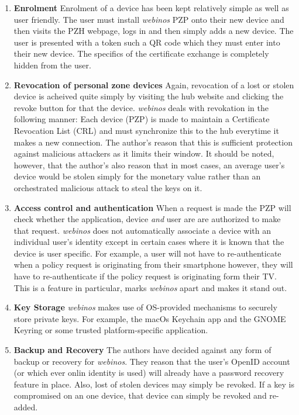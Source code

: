 \begin{enumerate}[label=\arabic*., wide, labelwidth=!, labelindent=0pt]
	\item \textbf{Enrolment} Enrolment of a device has been kept relatively simple as well as user friendly. The user must install \textit{webinos} 		PZP onto their new device and then visits the PZH webpage, logs in and then simply adds a new device. The user is presented with a token such 	a QR code which they must enter into their new device. The specifics of the certificate exchange is completely hidden from the user.
	
	\item \textbf{Revocation of personal zone devices} Again, revocation of a lost or stolen device is acheived quite simply by visiting the hub 				website and clicking the revoke button for that the device. \textit{webinos} deals with revokation in the following manner: Each device (PZP) is 		made to maintain a Certificate Revocation List (CRL) and must synchronize this to the hub everytime it makes a new connection. The author's 		reason that this is sufficient protection against malicious attackers as it limits their window. It should be noted, however, that the author's also 		reason that in most cases, an 	average user's device would be stolen simply for the monetary value rather than an orchestrated malicious 				attack to steal the keys on it.
	
	\item \textbf{Access control and authentication} When a request is made the PZP will check whether the application, device \textit{and} user 		are are authorized to make that request. \textit{webinos} does not automatically associate a device with an individual user's identity except in 		certain cases where it is known that the device is user specific. For example, a user will not have to re-authenticate when a policy request is 			originating from their smartphone however, they will have to re-authenticate if the policy request is originating form their TV. This is a feature 		in particular, marks \textit{webinos} apart and makes it stand out. 
	
	\item \textbf{Key Storage} \textit{webinos} makes use of OS-provided mechanisms to securely store private keys. For example, the  						macOs Keychain app and the GNOME Keyring or some trusted platform-specific application. 
	
	\item \textbf{Backup and Recovery} The authors have decided against any form of backup or recovery for \textit{webinos}. They reason that 		the user's OpenID account (or which ever onlin identity is used) will already have a password recovery feature in place. Also, lost of stolen 				devices may simply be revoked. If a key is compromised on an one device, that device can simply be revoked and re-added.

\end{enumerate}

